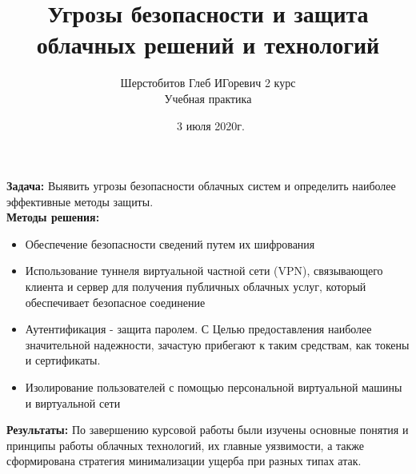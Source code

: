 \documentclass[aspectratio=169]{beamer}
\title{Угрозы безопасности и защита облачных решений и технологий}
\author{Шерстобитов Глеб ИГоревич
2 курс  \\ Учебная практика}
\date{\ 3 июля 2020г.}
\institute{Балтийский федеральный университет им. Канта}
\begin{document}
	
	\begin{frame}
		\titlepage 
	\end{frame}
	
	\begin{frame}
	\textbf{Задача:} Выявить угрозы безопасности облачных систем и определить наиболее эффективные методы защиты. \\ 
	
	\textbf{Методы решения:}
	\begin{itemize}
		\item Обеспечение безопасности сведений путем их шифрования
		\item Использование туннеля
		виртуальной частной сети (VPN), связывающего клиента и сервер для получения публичных облачных услуг, который обеспечивает безопасное соединение
		\item Аутентификация - защита паролем. С Целью предоставления наиболее
		значительной надежности, зачастую прибегают к таким средствам, как токены и
		сертификаты.
		\item Изолирование пользователей с помощью персональной виртуальной машины и виртуальной сети
	\end{itemize}	
	\end{frame}

	\begin{frame}
	\textbf{Результаты:} По завершению курсовой работы были изучены основные понятия и принципы работы облачных технологий, их главные уязвимости, а также сформирована стратегия минимализации ущерба при разных типах атак.
	\end{frame}
	
\end{document}
